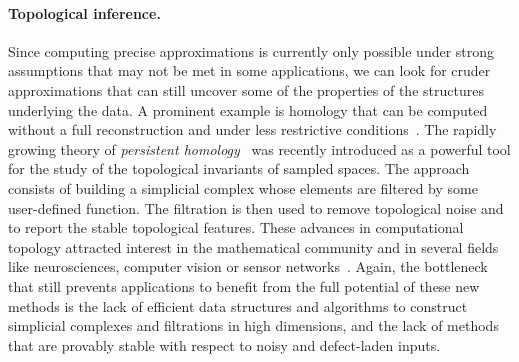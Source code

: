 \paragraph{Topological inference.}
Since computing precise approximations is currently only possible under strong assumptions that may not be met in some applications, we can look for cruder approximations 
that can still  uncover some of the properties of the structures underlying the data.
%
%
A prominent example is homology that can be computed  without a full reconstruction and under less restrictive conditions~\cite{geometrica-ccl09,nsw-fhm-2008}. The rapidly growing theory of {\em persistent homology}~\cite{eh-ph-2008,rg-bptd-2008} was recently introduced as a powerful tool for the study of the topological invariants of sampled spaces. The approach consists of building a simplicial complex whose elements are filtered by some user-defined function. The filtration is then used to remove topological noise and to report the stable topological features.  These advances in computational topology attracted interest in the mathematical community and in several fields like neurosciences, computer vision or sensor networks~\cite{cids-lbsni-2008,rg-bptd-2008}. Again, the bottleneck that still prevents applications to benefit from the full potential of these new methods is the lack of efficient data structures and algorithms to construct simplicial complexes and filtrations in high dimensions, and the lack of methods that are provably stable with respect to  noisy and defect-laden inputs.


